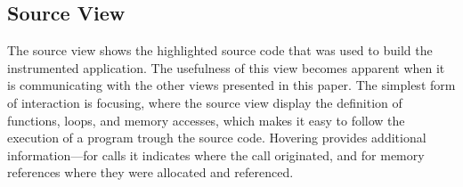 \subsection{Source View}
The source view shows the highlighted source code that was used to
build the instrumented application. The usefulness of this view becomes
apparent when it is communicating with the other views presented in this paper.
The simplest form of interaction is focusing, where the source view display the
definition of functions, loops, and memory accesses, which makes it easy to
follow the execution of a program trough the source code. Hovering provides
additional information---for calls it indicates where the call originated, and
for memory references where they were allocated and referenced.